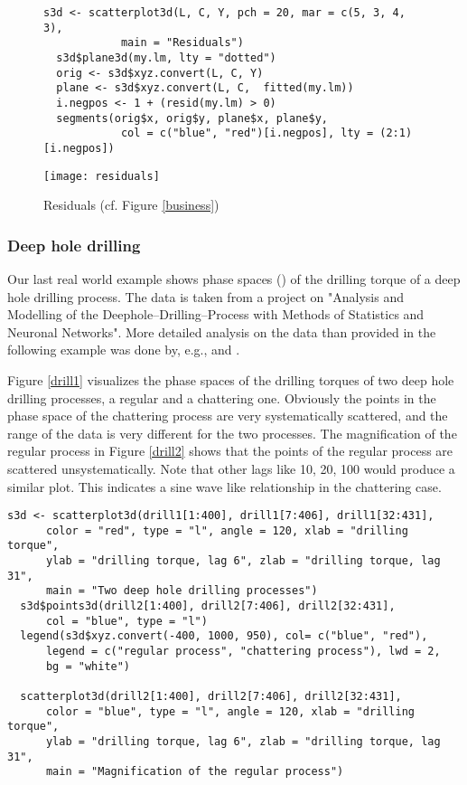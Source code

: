 \begin{figure}[htb!]
\small
\begin{Verbatim}[frame=single]
  s3d <- scatterplot3d(L, C, Y, pch = 20, mar = c(5, 3, 4, 3),
            main = "Residuals")
  s3d$plane3d(my.lm, lty = "dotted")
  orig <- s3d$xyz.convert(L, C, Y)
  plane <- s3d$xyz.convert(L, C,  fitted(my.lm))
  i.negpos <- 1 + (resid(my.lm) > 0)
  segments(orig$x, orig$y, plane$x, plane$y,
            col = c("blue", "red")[i.negpos], lty = (2:1)[i.negpos])
\end{Verbatim}
\normalsize
\begin{center}\texttt{[image: residuals]}\end{center}
\vspace*{-5mm}\caption{Residuals (cf. Figure \ref{business})\label{residuals}}
\end{figure}


\clearpage
\subsubsection{Deep hole drilling}
Our last real world example shows phase spaces (\cite{tong93}) of the drilling torque of a deep hole drilling process.
The data is taken from a project on
"Analysis and Modelling of the Deephole--Drilling--Process with Methods of Statistics and Neuronal Networks".
More detailed analysis on the data than provided in the following example was done by,
e.g.,  and .

Figure \ref{drill1} visualizes the phase spaces of the drilling torques of two deep hole drilling processes,
a regular and a chattering one.
Obviously the points in the phase space of the chattering process are very systematically scattered,
and the range of the data is very different for the two processes.
The magnification of the regular process in Figure \ref{drill2} shows that the points of the regular process are scattered
unsystematically.
Note that other lags like 10, 20, 100 would produce a similar plot.
This indicates a sine wave like relationship in the chattering case.

\vspace{10mm}
\small
\begin{Verbatim}[frame=single]
  s3d <- scatterplot3d(drill1[1:400], drill1[7:406], drill1[32:431],
      color = "red", type = "l", angle = 120, xlab = "drilling torque",
      ylab = "drilling torque, lag 6", zlab = "drilling torque, lag 31",
      main = "Two deep hole drilling processes")
  s3d$points3d(drill2[1:400], drill2[7:406], drill2[32:431],
      col = "blue", type = "l")
  legend(s3d$xyz.convert(-400, 1000, 950), col= c("blue", "red"),
      legend = c("regular process", "chattering process"), lwd = 2,
      bg = "white")

  scatterplot3d(drill2[1:400], drill2[7:406], drill2[32:431],
      color = "blue", type = "l", angle = 120, xlab = "drilling torque",
      ylab = "drilling torque, lag 6", zlab = "drilling torque, lag 31",
      main = "Magnification of the regular process")
\end{Verbatim}
\normalsize


